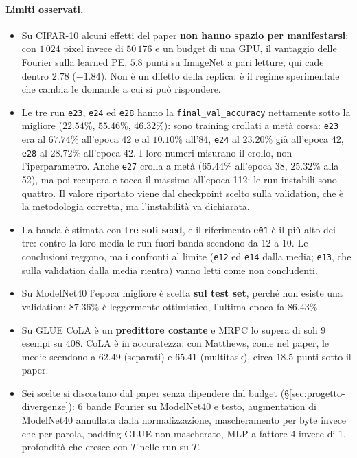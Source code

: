 \documentclass[
  11pt,
]{article}
\begin{document}
\paragraph{Limiti osservati.}
\begin{itemize}
\item Su CIFAR-10 alcuni effetti del paper \textbf{non hanno spazio per manifestarsi}: con $1\,024$ pixel invece di $50\,176$ e un budget di una GPU, il vantaggio delle Fourier sulla learned PE, $5.8$ punti su ImageNet a pari letture, qui cade dentro $2.78$ ($-1.84$). Non è un difetto della replica: è il regime sperimentale che cambia le domande a cui si può rispondere.
\item Le tre run \texttt{e23}, \texttt{e24} ed \texttt{e28} hanno la \texttt{final\_val\_accuracy} nettamente sotto la migliore ($22.54\%$, $55.46\%$, $46.32\%$): sono training crollati a metà corsa: \texttt{e23} era al $67.74\%$ all'epoca 42 e al $10.10\%$ all'84, \texttt{e24} al $23.20\%$ già all'epoca 42, \texttt{e28} al $28.72\%$ all'epoca 42. I loro numeri misurano il crollo, non l'iperparametro. Anche \texttt{e27} crolla a metà ($65.44\%$ all'epoca 38, $25.32\%$ alla 52), ma poi recupera e tocca il massimo all'epoca 112: le run instabili sono quattro. Il valore riportato viene dal checkpoint scelto sulla validation, che è la metodologia corretta, ma l'instabilità va dichiarata.
\item La banda è stimata con \textbf{tre soli seed}, e il riferimento \texttt{e01} è il più alto dei tre: contro la loro media le run fuori banda scendono da 12 a 10. Le conclusioni reggono, ma i confronti al limite (\texttt{e12} ed \texttt{e14} dalla media; \texttt{e13}, che sulla validation dalla media rientra) vanno letti come non concludenti.
\item Su ModelNet40 l'epoca migliore è scelta \textbf{sul test set}, perché non esiste una validation: $87.36\%$ è leggermente ottimistico, l'ultima epoca fa $86.43\%$.
\item Su GLUE CoLA è un \textbf{predittore costante} e MRPC lo supera di soli 9 esempi su 408. CoLA è in accuratezza: con Matthews, come nel paper, le medie scendono a $62.49$ (separati) e $65.41$ (multitask), circa $18.5$ punti sotto il paper.
\item Sei scelte si discostano dal paper senza dipendere dal budget (§\ref{sec:progetto-divergenze}): 6 bande Fourier su ModelNet40 e testo, augmentation di ModelNet40 annullata dalla normalizzazione, mascheramento per byte invece che per parola, padding GLUE non mascherato, MLP a fattore 4 invece di 1, profondità che cresce con $T$ nelle run su $T$.
\end{itemize}
\end{document}
